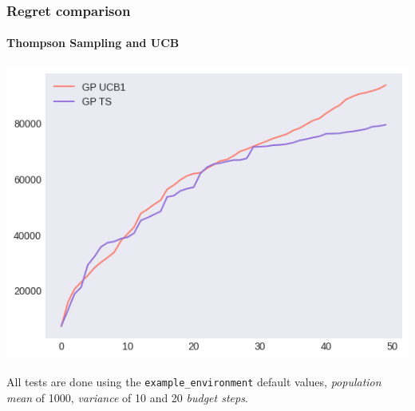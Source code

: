 \begin{frame}[plain]

\frametitle{Regret comparison}
\framesubtitle{Thompson Sampling and UCB}

\begin{center}
	\hspace*{-2.8em}
	\includegraphics[scale=0.55]{img/Graphs/uncertain_alpha_unit/image3.png}
\end{center}

\scriptsize All tests are done using the \texttt{example\_environment} default values, \textit{population mean} of 1000, \textit{variance} of 10 and 20 \textit{budget steps}.

\end{frame}


